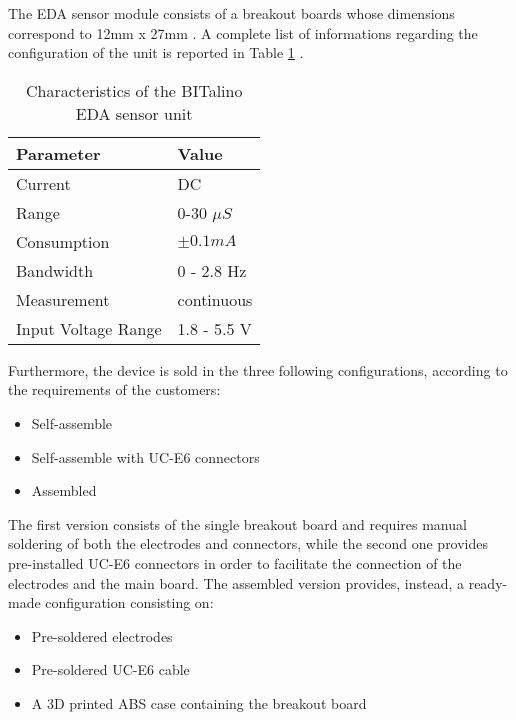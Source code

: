 The EDA sensor module consists of a breakout boards whose dimensions correspond to 12mm x 27mm \cite{bitalino-general}. A complete list of informations regarding the configuration of the unit is reported in Table \ref{toc:bitalino-features} .

\begin{table}[H]
\centering
\begin{tabular}{ll}
    \hline
    Parameter               & Value \\
    \hline
    Current                 & DC \\
    Range                   & 0-30 $\mu S$ \\
    Consumption             & $\pm 0.1 mA$ \\
    Bandwidth               & 0 - 2.8 Hz \\
    Measurement             & continuous \\
    Input Voltage Range     & 1.8 - 5.5 V \\
    \hline
\end{tabular}
\caption{Characteristics of the BITalino EDA sensor unit}
\label{toc:bitalino-features}
\end{table}

Furthermore, the device is sold in the three following configurations, according to the requirements of the customers: 

\begin{itemize}
    \item Self-assemble
    \item Self-assemble with UC-E6 connectors
    \item Assembled
\end{itemize}

The first version consists of the single breakout board and requires manual soldering of both the electrodes and connectors, while the second one provides pre-installed UC-E6 connectors in order to facilitate the connection of the electrodes and the main board. The assembled version provides, instead, a ready-made configuration consisting on: 

\begin{itemize}
    \item Pre-soldered electrodes
    \item Pre-soldered UC-E6 cable
    \item A 3D printed ABS case containing the breakout board
\end{itemize}


